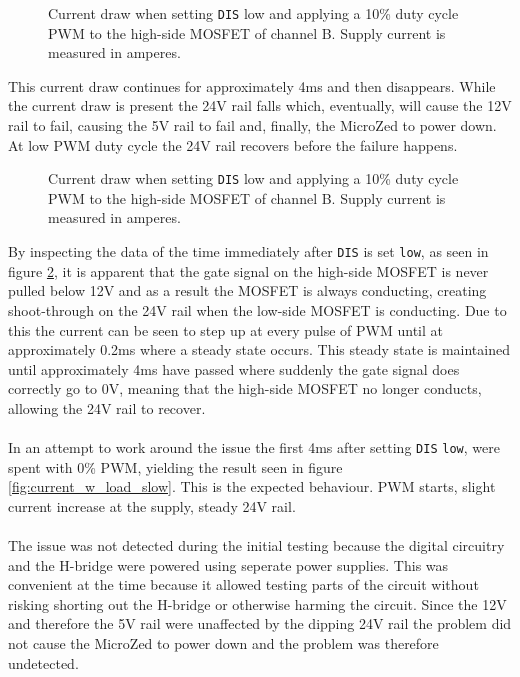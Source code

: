 \begin{figure}[h]
	\centering
	\caption[Main power supply current draw, 0\% duty cycle.]{Current draw when setting \texttt{DIS} low and applying a 10\% duty cycle PWM to the high-side MOSFET of channel B. Supply current is measured in amperes.}
	\label{fig:current_w_load}
\end{figure}

This current draw continues for approximately 4ms and then disappears.
While the current draw is present the 24V rail falls which, eventually, will cause the 12V rail to fail, causing the 5V rail to fail and, finally, the MicroZed to power down.
At low PWM duty cycle the 24V rail recovers before the failure happens.

\begin{figure}[h]
	\centering
	\caption[Main power supply current draw, 10\% duty cycle.]{Current draw when setting \texttt{DIS} low and applying a 10\% duty cycle PWM to the high-side MOSFET of channel B. Supply current is measured in amperes.}
	\label{fig:current_w_load_closeup}
\end{figure}

By inspecting the data of the time immediately after \texttt{DIS} is set \texttt{low}, as seen in figure \ref{fig:current_w_load_closeup}, it is apparent that the gate signal on the high-side MOSFET is never pulled below 12V and as a result the MOSFET is always conducting, creating shoot-through on the 24V rail when the low-side MOSFET is conducting.
Due to this the current can be seen to step up at every pulse of PWM until at approximately 0.2ms where a steady state occurs.
This steady state is maintained until approximately 4ms have passed where suddenly the gate signal does correctly go to 0V, meaning that the high-side MOSFET no longer conducts, allowing the 24V rail to recover.
\\~\\
In an attempt to work around the issue the first 4ms after setting \texttt{DIS} \texttt{low}, were spent with 0\% PWM, yielding the result seen in figure \ref{fig:current_w_load_slow}.
This is the expected behaviour.
PWM starts, slight current increase at the supply, steady 24V rail.
\\~\\
The issue was not detected during the initial testing because the digital circuitry and the H-bridge were powered using seperate power supplies.
This was convenient at the time because it allowed testing parts of the circuit without risking shorting out the H-bridge or otherwise harming the circuit.
Since the 12V and therefore the 5V rail were unaffected by the dipping 24V rail the problem did not cause the MicroZed to power down and the problem was therefore undetected. 

